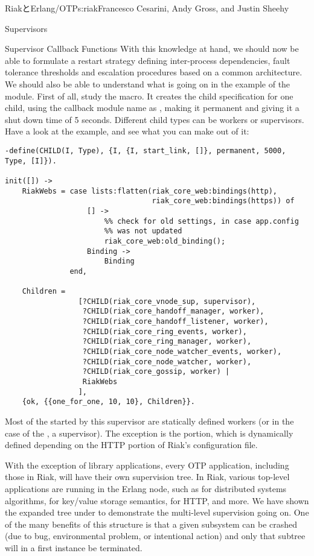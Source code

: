 \begin{aosachapter}{RiakとErlang/OTP}{s:riak}{Francesco Cesarini, Andy Gross, and Justin Sheehy}
\begin{aosasect1}{Supervisors}
\begin{aosasect2}{Supervisor Callback Functions}
With this knowledge at hand, we should now be able to formulate a
restart strategy defining inter-process dependencies, fault tolerance
thresholds and escalation procedures based on a common
architecture. We should also be able to understand what is going on in
the  example of the 
module. First of all, study the  macro. It creates the
child specification for one child, using the callback module name as
, making it permanent and giving it a shut down time of 5
seconds. Different child types can be workers or supervisors. Have a
look at the example, and see what you can make out of it:

\begin{verbatim}
-define(CHILD(I, Type), {I, {I, start_link, []}, permanent, 5000, Type, [I]}).

init([]) ->
    RiakWebs = case lists:flatten(riak_core_web:bindings(http),
                                  riak_core_web:bindings(https)) of
                   [] ->
                       %% check for old settings, in case app.config
                       %% was not updated
                       riak_core_web:old_binding();
                   Binding ->
                       Binding
               end,

    Children =
                 [?CHILD(riak_core_vnode_sup, supervisor),
                  ?CHILD(riak_core_handoff_manager, worker),
                  ?CHILD(riak_core_handoff_listener, worker),
                  ?CHILD(riak_core_ring_events, worker),
                  ?CHILD(riak_core_ring_manager, worker),
                  ?CHILD(riak_core_node_watcher_events, worker),
                  ?CHILD(riak_core_node_watcher, worker),
                  ?CHILD(riak_core_gossip, worker) |
                  RiakWebs
                 ],
    {ok, {{one_for_one, 10, 10}, Children}}.
\end{verbatim}

Most of the  started by this supervisor are statically
defined workers (or in the case of the , a
supervisor).  The exception is the  portion, which is
dynamically defined depending on the HTTP portion of Riak's
configuration file.

With the exception of library applications, every OTP application,
including those in Riak, will have their own supervision tree. In
Riak, various top-level applications are running in the Erlang node,
such as  for distributed systems algorithms,
 for key/value storage semantics,  for
HTTP, and more.  We have shown the expanded tree under
 to demonstrate the multi-level supervision going on.
One of the many benefits of this structure is that a given subsystem
can be crashed (due to bug, environmental problem, or intentional
action) and only that subtree will in a first instance be terminated.


\end{aosasect2}
\end{aosasect1}
\end{aosachapter}
